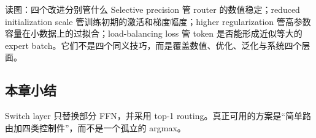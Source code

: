 \begin{knowledgebox}{读图：四个改进分别管什么}
Selective precision 管 router 的数值稳定；reduced initialization scale 管训练初期的激活和梯度幅度；higher regularization 管高参数容量在小数据上的过拟合；load-balancing loss 管 token 是否能形成近似等大的 expert batch。它们不是四个同义技巧，而是覆盖数值、优化、泛化与系统四个层面。
\end{knowledgebox}

\subsection{本章小结}

Switch layer 只替换部分 FFN，并采用 top-1 routing。真正可用的方案是“简单路由加四类控制件”，而不是一个孤立的 argmax。

